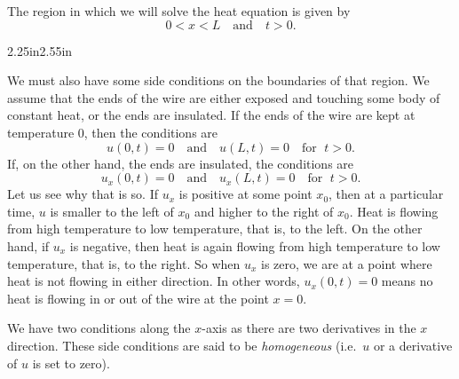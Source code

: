 The region in which we will solve the heat equation is given by 
\begin{equation*}
0 < x < L \quad \text{and} \quad t > 0 .
\end{equation*}
\begin{mywrapfigsimp}[10]{2.25in}{2.55in}
\noindent
{}
\end{mywrapfigsimp}
We must also have some side conditions on the boundaries of that region.
We assume that the ends of the wire are either exposed 
and touching some body of constant heat, or the ends are insulated.
If the ends of the wire are kept at temperature 0, then
the conditions are
\begin{equation*}
u(0,t) = 0 \quad \text{and} \quad u(L,t) = 0
\quad \text{for } \; t > 0.
\end{equation*}
If, on the other hand, the ends are insulated, the conditions are
\begin{equation*}
u_x(0,t) = 0 \quad \text{and} \quad u_x(L,t) = 0
\quad \text{for } \; t > 0 .
\end{equation*}
Let us see why that is so.
If $u_x$ is positive at some point $x_0$, then at a particular time,
$u$ is smaller to the left of $x_0$ and higher to the right of $x_0$.
Heat is flowing from high temperature to low temperature, that is, to the left.
On the other hand, if $u_x$ is negative, then heat is again flowing
from high temperature to low
temperature, that is, to the right.  So when $u_x$ is zero,
we are at a point where 
heat is not flowing in either direction.
In other words, $u_x(0,t) = 0$ means
no heat is flowing in or out of the wire at the point $x=0$.

We have two conditions along the $x$-axis as there are
two derivatives in the $x$ direction.
These side conditions are said to be
\emph{homogeneous}
(i.e.\ $u$ or a derivative of $u$ is set to zero).

